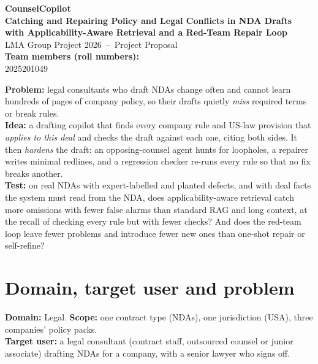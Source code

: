 \documentclass[11pt,a4paper]{article}
\begin{document}
\begin{center}
{\LARGE\bfseries\color{accent} CounselCopilot}\\[3pt]
{\Large\bfseries\color{accent} Catching and Repairing Policy and Legal Conflicts in NDA Drafts\\[1pt]
with Applicability-Aware Retrieval and a Red-Team Repair Loop}\\[6pt]
{\large LMA Group Project 2026 \,--\, Project Proposal}\\[3pt]
\textbf{Team members (roll numbers):}\\[1pt]
2025201049   
\end{center}

\begin{keybox}[title=Summary in three lines]
\textbf{Problem:} legal consultants who draft NDAs change often and cannot learn hundreds of pages of company policy, so their drafts quietly \emph{miss} required terms or break rules.\\
\textbf{Idea:} a drafting copilot that finds every company rule and US-law provision that \emph{applies to this deal} and checks the draft against each one, citing both sides. It then \emph{hardens} the draft: an opposing-counsel agent hunts for loopholes, a repairer writes minimal redlines, and a regression checker re-runs every rule so that no fix breaks another.\\
\textbf{Test:} on real NDAs with expert-labelled and planted defects, and with deal facts the system must read from the NDA, does applicability-aware retrieval catch more omissions with fewer false alarms than standard RAG and long context, at the recall of checking every rule but with fewer checks? And does the red-team loop leave fewer problems and introduce fewer new ones than one-shot repair or self-refine?
\end{keybox}

\section{Domain, target user and problem}
\textbf{Domain:} Legal. \textbf{Scope:} one contract type (NDAs), one jurisdiction (USA), three companies' policy packs.\\
\textbf{Target user:} a legal consultant (contract staff, outsourced counsel or junior associate) drafting NDAs for a company, with a senior lawyer who signs off.
\end{document}
